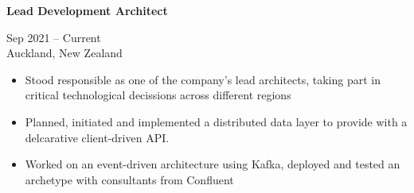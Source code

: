 \documentclass[10pt,a4paper,ragged2e,withhyper]{altacv}
\renewcommand{\cvevent}[4]{%
  \textbf{#1} %
  \hfill %
  \begin{minipage}[t]{.5\linewidth}
    \raggedleft %
    \small#3 %
    \\ %
    #4 %
  \end{minipage}
  \vspace{\baselineskip} %
}
\begin{document}
\begin{paracol}{2}

\divider

\divider

\divider

\divider

\divider

\divider

\divider

\divider

\divider


\switchcolumn

\divider

\divider

\divider

\divider

\divider

\divider

\divider

\divider

\divider


\end{paracol}

\vspace{0.5cm}







\cvevent{Lead Development Architect}{Idexx Laboratories}{Sep 2021 -- Current}{Auckland, New Zealand}


\begin{itemize}
\item Stood responsible as one of the company’s lead architects, taking part in critical technological decissions across
different regions 
\item Planned, initiated and implemented a distributed data layer to provide with a delcarative client-driven API.
\item Worked on an event-driven architecture using Kafka, deployed and tested an archetype with consultants from
Confluent 
\end{itemize}
\end{document}
